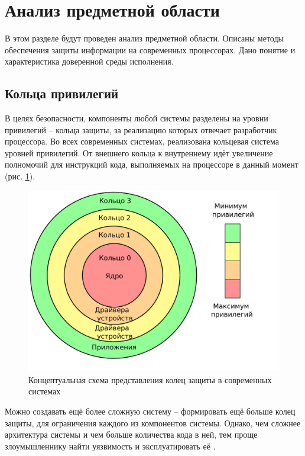 \section{Анализ предметной области}

В этом разделе будут проведен анализ предметной области. Описаны методы обеспечения защиты информации на современных процессорах. Дано понятие и характеристика доверенной среды исполнения.

\subsection{Кольца привилегий}

В целях безопасности, компоненты любой системы разделены на уровни привилегий -- кольца защиты, за реализацию которых отвечает разработчик процессора. Во всех современных системах, реализована кольцевая система уровней привилегий. От внешнего кольца к внутреннему идёт увеличение полномочий для инструкций кода, выполняемых на процессоре в данный момент (рис. \ref{fig:rings}).

\begin{figure}[h]
	\centering
	\includegraphics[width=\textwidth]{img/rings.pdf}
	\caption{Концептуальная схема представления колец защиты в современных системах}
	\label{fig:rings}
\end{figure}

Можно создавать ещё более сложную систему -- формировать ещё больше колец защиты, для ограничения каждого из компонентов системы. Однако, чем сложнее архитектура системы и чем больше количества кода в ней, тем проще злоумышленнику найти уязвимость и эксплуатировать её \cite{complex-systems}.


